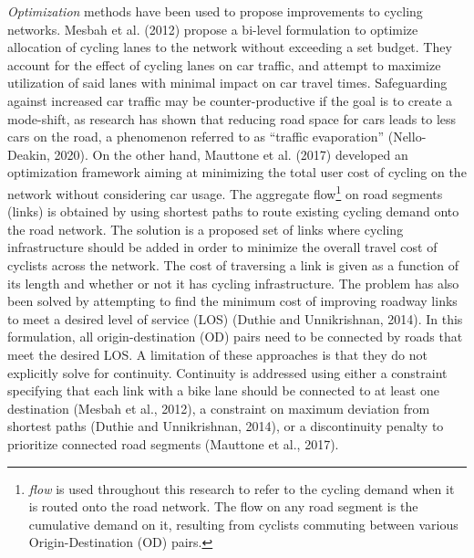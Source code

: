 \documentclass[
]{article}
\begin{document}
\emph{Optimization} methods have been used to propose improvements to
cycling networks. Mesbah et al. (2012) propose a bi-level formulation to
optimize allocation of cycling lanes to the network without exceeding a
set budget. They account for the effect of cycling lanes on car traffic,
and attempt to maximize utilization of said lanes with minimal impact on
car travel times. Safeguarding against increased car traffic may be counter-productive if the goal is to create a mode-shift, as research has shown that reducing road space for cars leads to less cars on the road, a phenomenon referred to as ``traffic evaporation'' (Nello-Deakin, 2020).
On the other hand, Mauttone et al. (2017) developed an optimization framework aiming at minimizing the total
user cost of cycling on the network without considering car usage. The aggregate flow\footnote{\emph{flow} is
  used throughout this research to refer to the cycling demand when it is
  routed onto the road network. The flow on any road segment is the
  cumulative demand on it, resulting from cyclists commuting between
  various Origin-Destination (OD) pairs.} on road segments (links) is obtained by using
shortest paths to route existing cycling demand onto the road network. The solution is a proposed set of links where cycling infrastructure
should be added in order to minimize the overall travel cost of cyclists
across the network. The cost of traversing a link is given as a function
of its length and whether or not it has cycling infrastructure. The
problem has also been solved by attempting to find the minimum cost of
improving roadway links to meet a desired level of service (LOS)
(Duthie and Unnikrishnan, 2014). In this formulation, all origin-destination
(OD) pairs need to be connected by roads that meet the desired LOS. A
limitation of these approaches is that they do not explicitly solve for
continuity. Continuity is addressed using either a constraint specifying
that each link with a bike lane should be connected to at least one
destination (Mesbah et al., 2012), a constraint on maximum deviation
from shortest paths (Duthie and Unnikrishnan, 2014), or a discontinuity
penalty to prioritize connected road segments (Mauttone et al., 2017).
\end{document}
